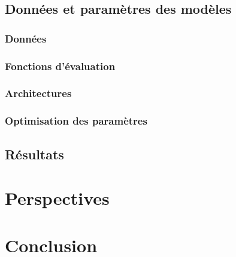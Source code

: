 \documentclass{report}
\begin{document}
	\section{Données et paramètres des modèles}
		\subsection{Données}
			
		\subsection{Fonctions d'évaluation}
				
		\subsection{Architectures}
			
		\subsection{Optimisation des paramètres}
			
		
	\section{Résultats}
		


\chapter{Perspectives}
	

\chapter*{Conclusion}
	






\addappheadtotoc
\appendixpage

\appendix


\end{document}
